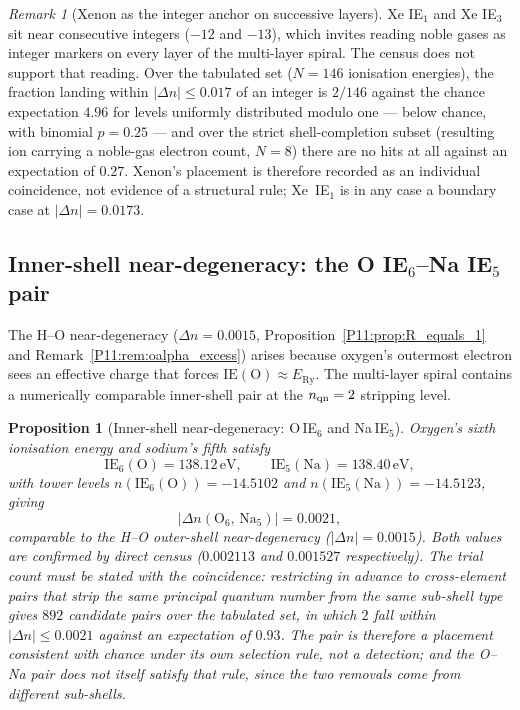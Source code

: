 \documentclass[11pt,a4paper]{article}
\newtheorem{proposition}[theorem]{Proposition}
\theoremstyle{definition}
\theoremstyle{remark}
\newtheorem{remark}[theorem]{Remark}
\newcommand{\ERy}{E_{\mathrm{Ry}}}
\newcommand{\nlvl}[1]{n\!\left(#1\right)}
\newcommand{\IE}{\mathrm{IE}}
\begin{document}
\begin{remark}[Xenon as the integer anchor on successive layers]
\label{P11:rem:xenon_anchor}
Xe IE$_1$ and Xe IE$_3$ sit near consecutive integers ($-12$ and
$-13$), which invites reading noble gases as integer markers on every
layer of the multi-layer spiral.  The census does not support that
reading.  Over the tabulated set ($N=146$ ionisation energies), the
fraction landing within $|\Delta n|\leq0.017$ of an integer is
$2/146$ against the chance expectation $4.96$ for levels uniformly
distributed modulo one --- below chance, with binomial $p=0.25$ ---
and over the strict shell-completion subset (resulting ion carrying a
noble-gas electron count, $N=8$) there are no hits at all against an
expectation of $0.27$.  Xenon's placement is therefore recorded as an
individual coincidence, not evidence of a structural rule; Xe~IE$_1$
is in any case a boundary case at $|\Delta n|=0.0173$.
\end{remark}

\subsection{Inner-shell near-degeneracy: the O IE$_6$--Na IE$_5$ pair}
\label{P11:subsec:inner_degen}

The H--O near-degeneracy ($\Delta n=0.0015$,
Proposition~\ref{P11:prop:R_equals_1} and Remark~\ref{P11:rem:oalpha_excess})
arises because oxygen's outermost electron sees an effective charge
that forces $\IE(\mathrm{O})\approx\ERy$.  The multi-layer spiral contains a numerically comparable
inner-shell pair at the $n_{\rm qn}=2$ stripping level.

\begin{proposition}[Inner-shell near-degeneracy: O\,IE$_6$ and Na\,IE$_5$]
\label{P11:prop:inner_degen}
Oxygen's sixth ionisation energy and sodium's fifth satisfy
\begin{equation}
  \IE_6(\mathrm{O}) = 138.12\,\mathrm{eV},
  \qquad
  \IE_5(\mathrm{Na}) = 138.40\,\mathrm{eV},
  \label{P11:eq:inner_IEs}
\end{equation}
with tower levels $\nlvl{\IE_6(\mathrm{O})}=-14.5102$ and
$\nlvl{\IE_5(\mathrm{Na})}=-14.5123$, giving
\begin{equation}
  |\Delta n(\mathrm{O}_6,\,\mathrm{Na}_5)| = 0.0021,
  \label{P11:eq:inner_degen_val}
\end{equation}
comparable to the H--O outer-shell near-degeneracy ($|\Delta n|=0.0015$).
Both values are confirmed by direct census
($0.002113$ and $0.001527$ respectively).  The trial count must be
stated with the coincidence: restricting in advance to cross-element
pairs that strip the same principal quantum number from the same
sub-shell type gives $892$ candidate pairs over the tabulated set, in
which $2$ fall within $|\Delta n|\leq0.0021$ against an expectation of
$0.93$.  The pair is therefore a placement consistent with chance
under its own selection rule, not a detection; and the O--Na pair does
not itself satisfy that rule, since the two removals come from
different sub-shells.
\end{proposition}
\end{document}
